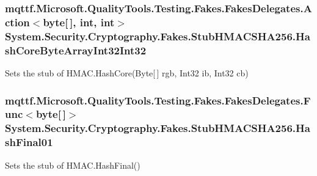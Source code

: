 \hypertarget{class_system_1_1_security_1_1_cryptography_1_1_fakes_1_1_stub_h_m_a_c_s_h_a256_a2b7704cc51f83091050183b0f94a0b3f}{
\subsubsection[{Hash\-Core\-Byte\-Array\-Int32\-Int32}]{\setlength{\rightskip}{0pt plus 5cm}mqttf.\-Microsoft.\-Quality\-Tools.\-Testing.\-Fakes.\-Fakes\-Delegates.\-Action$<$byte\mbox{[}$\,$\mbox{]}, int, int$>$ System.\-Security.\-Cryptography.\-Fakes.\-Stub\-H\-M\-A\-C\-S\-H\-A256.\-Hash\-Core\-Byte\-Array\-Int32\-Int32}}\label{class_system_1_1_security_1_1_cryptography_1_1_fakes_1_1_stub_h_m_a_c_s_h_a256_a2b7704cc51f83091050183b0f94a0b3f}


Sets the stub of H\-M\-A\-C.\-Hash\-Core(\-Byte\mbox{[}$\,$\mbox{]} rgb, Int32 ib, Int32 cb)

\hypertarget{class_system_1_1_security_1_1_cryptography_1_1_fakes_1_1_stub_h_m_a_c_s_h_a256_abd7f7c329fe8ae14bfcfdf87363305e4}{
\subsubsection[{Hash\-Final01}]{\setlength{\rightskip}{0pt plus 5cm}mqttf.\-Microsoft.\-Quality\-Tools.\-Testing.\-Fakes.\-Fakes\-Delegates.\-Func$<$byte\mbox{[}$\,$\mbox{]}$>$ System.\-Security.\-Cryptography.\-Fakes.\-Stub\-H\-M\-A\-C\-S\-H\-A256.\-Hash\-Final01}}\label{class_system_1_1_security_1_1_cryptography_1_1_fakes_1_1_stub_h_m_a_c_s_h_a256_abd7f7c329fe8ae14bfcfdf87363305e4}


Sets the stub of H\-M\-A\-C.\-Hash\-Final()

